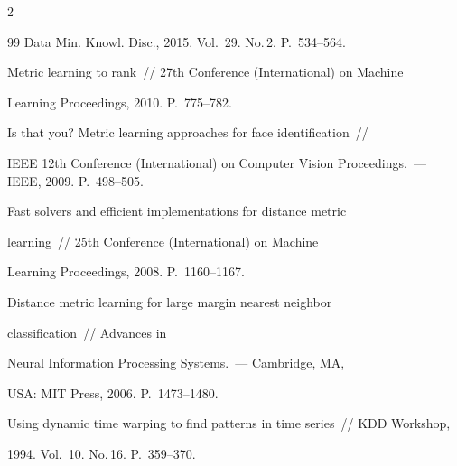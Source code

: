 \begin{multicols}{2}
{{\begin{thebibliography}{99}
Data Min. Knowl. Disc., 2015. Vol.~29. No.\,2. P.~534--564.









Metric learning to rank~// 27th  Conference (International) on Machine


  Learning Proceedings, 2010. P.~775--782.









Is that you? Metric learning approaches for face identification~// 


IEEE 12th  Conference (International) on Computer Vision Proceedings.~--- IEEE, 2009. P.~498--505.









Fast solvers and efficient implementations for distance metric


  learning~// 25th  Conference (International) on Machine


Learning Proceedings, 2008. P.~1160--1167.









Distance metric learning for large margin nearest neighbor


  classification~// Advances in


  Neural Information Processing Systems.~--- Cambridge, MA,


  USA: MIT Press, 2006. P.~1473--1480.









Using dynamic time warping to find patterns in time series~// KDD Workshop, 


1994. Vol.~10. No.\,16. P.~359--370.






\end{thebibliography}}}
\end{multicols}
